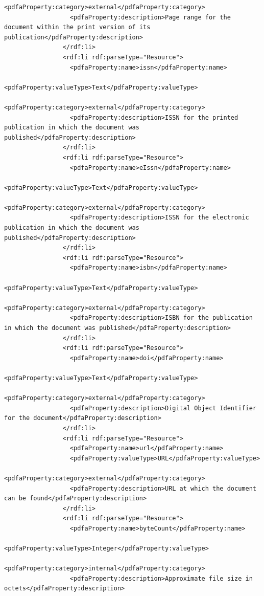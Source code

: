 \documentclass[12pt, twoside]{article}
\begin{document}
\begin{lstlisting}[style=myXML,
caption={Second part of the XML metadata embedded in a PDF file (some reformatting has been done to fit the text in the borders)}, label={lst:pdfinfoOutputPart2}]
                  <pdfaProperty:category>external</pdfaProperty:category>
                  <pdfaProperty:description>Page range for the document within the print version of its publication</pdfaProperty:description>
                </rdf:li>
                <rdf:li rdf:parseType="Resource">
                  <pdfaProperty:name>issn</pdfaProperty:name>
                  <pdfaProperty:valueType>Text</pdfaProperty:valueType>
                  <pdfaProperty:category>external</pdfaProperty:category>
                  <pdfaProperty:description>ISSN for the printed publication in which the document was published</pdfaProperty:description>
                </rdf:li>
                <rdf:li rdf:parseType="Resource">
                  <pdfaProperty:name>eIssn</pdfaProperty:name>
                  <pdfaProperty:valueType>Text</pdfaProperty:valueType>
                  <pdfaProperty:category>external</pdfaProperty:category>
                  <pdfaProperty:description>ISSN for the electronic publication in which the document was published</pdfaProperty:description>
                </rdf:li>
                <rdf:li rdf:parseType="Resource">
                  <pdfaProperty:name>isbn</pdfaProperty:name>
                  <pdfaProperty:valueType>Text</pdfaProperty:valueType>
                  <pdfaProperty:category>external</pdfaProperty:category>
                  <pdfaProperty:description>ISBN for the publication in which the document was published</pdfaProperty:description>
                </rdf:li>
                <rdf:li rdf:parseType="Resource">
                  <pdfaProperty:name>doi</pdfaProperty:name>
                  <pdfaProperty:valueType>Text</pdfaProperty:valueType>
                  <pdfaProperty:category>external</pdfaProperty:category>
                  <pdfaProperty:description>Digital Object Identifier for the document</pdfaProperty:description>
                </rdf:li>
                <rdf:li rdf:parseType="Resource">
                  <pdfaProperty:name>url</pdfaProperty:name>
                  <pdfaProperty:valueType>URL</pdfaProperty:valueType>
                  <pdfaProperty:category>external</pdfaProperty:category>
                  <pdfaProperty:description>URL at which the document can be found</pdfaProperty:description>
                </rdf:li>
                <rdf:li rdf:parseType="Resource">
                  <pdfaProperty:name>byteCount</pdfaProperty:name>
                  <pdfaProperty:valueType>Integer</pdfaProperty:valueType>
                  <pdfaProperty:category>internal</pdfaProperty:category>
                  <pdfaProperty:description>Approximate file size in octets</pdfaProperty:description>

\end{lstlisting}
\end{document}
